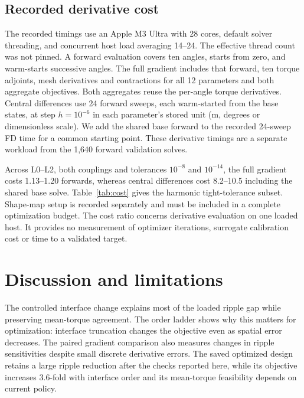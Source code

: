 \documentclass{anvil-paper}
\begin{document}
\subsection{Recorded derivative cost}
The recorded timings use an Apple M3 Ultra with 28 cores, default solver
threading, and concurrent host load averaging 14--24. The effective thread
count was not pinned. A forward evaluation covers ten angles, starts from
zero, and warm-starts successive angles. The full gradient includes that
forward, ten torque adjoints, mesh derivatives and contractions for all
12 parameters and both aggregate objectives. Both aggregates reuse the
per-angle torque derivatives. Central differences use 24 forward sweeps,
each warm-started from the base states, at step $h=10^{-6}$ in each
parameter's stored unit (m, degrees or dimensionless scale). We add the
shared base forward to the recorded 24-sweep FD time for a common starting
point. These derivative timings are a separate workload from the 1,640
forward validation solves.

Across L0--L2, both couplings and tolerances $10^{-8}$ and $10^{-14}$, the
full gradient costs 1.13--1.20 forwards, whereas central differences cost
8.2--10.5 including the shared base solve. Table~\ref{tab:cost} gives the harmonic tight-tolerance subset.
Shape-map setup is recorded separately and must be included in a complete
optimization budget. The cost ratio concerns derivative evaluation
on one loaded host. It provides no measurement of optimizer iterations,
surrogate calibration cost or time to a validated target.

\begin{table}[H]\centering\small
\caption{Recorded harmonic-model cost at relative tolerance $10^{-14}$,
initial design and full current. Times are seconds for ten-angle sweeps;
FD includes the shared base sweep, and setup is a one-time shape-map cost.}
\label{tab:cost}
\end{table}

\section{Discussion and limitations}
The controlled interface change explains most of the loaded ripple gap
while preserving mean-torque agreement. The order ladder shows why this
matters for optimization: interface truncation changes the objective even
as spatial error decreases. The paired gradient comparison also measures
changes in ripple sensitivities despite small discrete derivative errors.
The saved optimized design retains a large ripple reduction after the
checks reported here, while its objective increases 3.6-fold with
interface order and its mean-torque feasibility depends on current policy.
\end{document}
